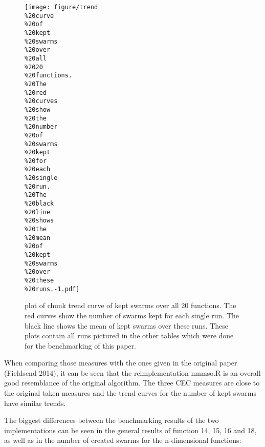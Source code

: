 \documentclass[12pt,a4paper]{article}
\begin{document}
\begin{figure}[htbp]
\centering
\texttt{[image: figure/trend\\\%20curve\\\%20of\\\%20kept\\\%20swarms\\\%20over\\\%20all\\\%2020\\\%20functions.\\\%20The\\\%20red\\\%20curves\\\%20show\\\%20the\\\%20number\\\%20of\\\%20swarms\\\%20kept\\\%20for\\\%20each\\\%20single\\\%20run.\\\%20The\\\%20black\\\%20line\\\%20shows\\\%20the\\\%20mean\\\%20of\\\%20kept\\\%20swarms\\\%20over\\\%20these\\\%20runs.-1.pdf]}
\caption{plot of chunk trend curve of kept swarms over all 20 functions.
The red curves show the number of swarms kept for each single run. The
black line shows the mean of kept swarms over these runs. These plots
contain all runs pictured in the other tables which were done for the
benchmarking of this paper.}
\end{figure}

When comparing those measures with the ones given in the original paper
(Fieldsend 2014), it can be seen that the reimplementation nmmso.R is an
overall good resemblance of the original algorithm. The three CEC
measures are close to the original taken measures and the trend curves
for the number of kept swarms have similar trends.

The biggest differences between the benchmarking results of the two
implementations can be seen in the general results of function 14, 15,
16 and 18, as well as in the number of created swarms for the
n-dimensional functions:
\end{document}
